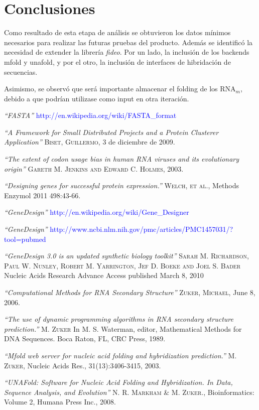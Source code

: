 \documentclass[12pt,a4paper,spanish]{article}
\begin{document}
\section{Conclusiones}
	Como resultado de esta etapa de análisis se obtuvieron los datos mínimos necesarios para realizar las futuras pruebas 		del producto. Además se identificó la necesidad de extender la librería \emph{fideo}. Por un lado, la inclusión de los 		backends \textsf{mfold}\cite{8}\cite{9} y \textsf{unafold}\cite{10}, y por el otro, la inclusión de interfaces de 		hibridación de secuencias.
	\par Asimismo, se observó que será importante almacenar el folding de los RNA$_m$, debido a que podrían utilizase como 		input en otra iteración.



\begin{thebibliography}{99}
\small	{} {\em{“FASTA”}} \textcolor{blue}{http://en.wikipedia.org/wiki/FASTA\_format}

\small	{} {\em{“A Framework for Small Distributed Projects and a Protein Clusterer Application”}}
			\textsc{Biset, Guillermo}, 3 de diciembre de 2009.

\small {} {\em{“The extent of codon usage bias in human RNA viruses and its evolutionary origin”}}
			\textsc{Gareth M. Jenkins and Edward C. Holmes}, 2003.
 
\small {} {\em{“Designing genes for successful protein expression.”}}
			\textsc{Welch, et al.}, Methods Enzymol 2011 498:43-66. 

\small {} {\em{“GeneDesign”}} \textcolor{blue}{http://en.wikipedia.org/wiki/Gene\_Designer}

\small {} {\em{“GeneDesign”}} \textcolor{blue}{http://www.ncbi.nlm.nih.gov/pmc/articles/PMC1457031/?tool=pubmed}

\small {} {\em{“GeneDesign 3.0 is an updated synthetic biology toolkit”}} 
			\textsc{Sarah M. Richardson, Paul W. Nunley, Robert M. Yarrington, Jef D. Boeke and Joel S. Bader} Nucleic 				Acids Research Advance Access published March 8, 2010

\small {} {\em{“Computational Methods for RNA Secondary Structure”}} 
			\textsc{Zuker, Michael}, June 8, 2006.

\small {} {\em{“The use of dynamic programming algorithms in RNA secondary structure prediction.”}}
		\textsc{M. Zuker} In M. S. Waterman, editor, Mathematical Methods for DNA Sequences. Boca Raton, FL, CRC Press, 		1989.

\small {} {\em{“Mfold web server for nucleic acid folding and hybridization prediction.”}}
		\textsc{M. Zuker}, Nucleic Acids Res., 31(13):3406-3415, 2003.

\small {} {\em{“UNAFold: Software for Nucleic Acid Folding and Hybridization. In Data, Sequence Analysis, and 			Evolution”}}
		\textsc{N. R. Markham \& M. Zuker.}, Bioinformatics: Volume 2, Humana Press Inc., 2008.

\end{thebibliography}
\end{document}

